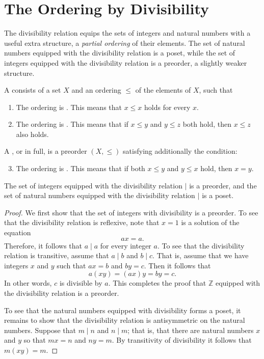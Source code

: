 \section{The Ordering by Divisibility}
The divisibility relation equips the sets of integers and natural numbers with a useful extra structure, a \emph{partial ordering} of their elements. The set of natural numbers equipped with the divisibility relation is a poset, while the set of integers equipped with the divisibility relation is a preorder, a slightly weaker structure.

\begin{definition}
  A  consists of a set $X$ and an ordering $\leq$ of the elements of $X$, such that
  \begin{enumerate}
  \item The ordering is . This means that $x\leq x$ holds for every $x$.
  \item The ordering is . This means that if $x \leq y$ and $y \leq z$ both hold, then $x\leq z$ also holds.
  \end{enumerate}
  A , or  in full, is a preorder $(X,{\leq})$ satisfying additionally the condition:
  \begin{enumerate}
  \setcounter{enumi}{2}
  \item The ordering is . This means that if both $x\leq y$ and $y\leq x$ hold, then $x=y$.
  \end{enumerate}
\end{definition}

\begin{theorem}
  The set of integers equipped with the divisibility relation $\mid$ is a preorder, and the set of natural numbers equipped with the divisibility relation $\mid$ is a poset.
\end{theorem}

\begin{proof}
  We first show that the set of integers with divisibility is a preorder. To see that the divisibility relation is reflexive, note that $x=1$ is a solution of the equation
  \begin{equation*}
    ax=a.
  \end{equation*}
  Therefore, it follows that $a\mid a$ for every integer $a$. To see that the divisibility relation is transitive, assume that $a\mid b$ and $b\mid c$. That is, assume that we have integers $x$ and $y$ such that $ax=b$ and $by=c$. Then it follows that
  \begin{equation*}
    a(xy)=(ax)y=by=c.
  \end{equation*}
  In other words, $c$ is divisible by $a$. This completes the proof that $\mathbb{Z}$ equipped with the divisibility relation is a preorder.

  To see that the natural numbers equipped with divisibility forms a poset, it remains to show that the divisibility relation is antisymmetric on the natural numbers. Suppose that $m\mid n$ and $n\mid m$; that is, that there are natural numbers $x$ and $y$ so that $mx=n$ and $ny=m$. By transitivity of divisibility it follows that $m(xy)=m$.
\end{proof}

